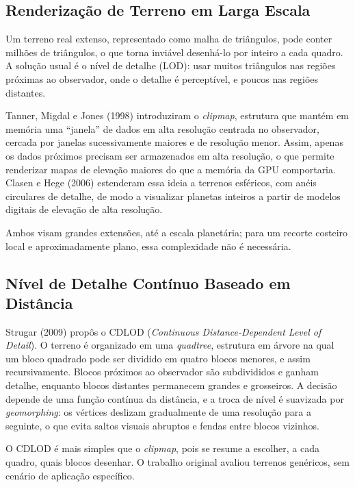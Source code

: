 \documentclass[conference]{IEEEtran}
\begin{document}
\subsection{Renderização de Terreno em Larga Escala}
\label{sub:terreno}

Um terreno real extenso, representado como malha de triângulos, pode
conter milhões de triângulos, o que torna inviável desenhá-lo por inteiro a
cada quadro. A solução usual é o nível de detalhe (LOD): usar muitos
triângulos nas regiões próximas ao observador, onde o detalhe é
perceptível, e poucos nas regiões distantes.

Tanner, Migdal e Jones (1998) introduziram o \emph{clipmap}, estrutura que
mantém em memória uma ``janela'' de dados em alta resolução centrada no
observador, cercada por janelas sucessivamente maiores e de resolução
menor. Assim, apenas os dados próximos precisam ser armazenados em alta
resolução, o que permite renderizar mapas de elevação maiores do que a
memória da GPU comportaria. Clasen e Hege (2006) estenderam essa ideia a
terrenos esféricos, com anéis circulares de detalhe, de modo a visualizar
planetas inteiros a partir de modelos digitais de elevação de alta
resolução.

Ambos visam grandes extensões, até a escala planetária; para um recorte
costeiro local e aproximadamente plano, essa complexidade não é necessária.

\subsection{Nível de Detalhe Contínuo Baseado em Distância}
\label{sub:cdlod-rel}

Strugar (2009) propôs o CDLOD (\emph{Continuous Distance-Dependent Level of
Detail}). O terreno é organizado em uma \emph{quadtree}, estrutura em
árvore na qual um bloco quadrado pode ser dividido em quatro blocos
menores, e assim recursivamente. Blocos próximos ao observador são
subdivididos e ganham detalhe, enquanto blocos distantes permanecem grandes
e grosseiros. A decisão depende de uma função contínua da distância, e a
troca de nível é suavizada por \emph{geomorphing}: os vértices deslizam
gradualmente de uma resolução para a seguinte, o que evita saltos visuais
abruptos e fendas entre blocos vizinhos.

O CDLOD é mais simples que o \emph{clipmap}, pois se resume a escolher, a
cada quadro, quais blocos desenhar. O trabalho original avaliou terrenos
genéricos, sem cenário de aplicação específico.
\end{document}
